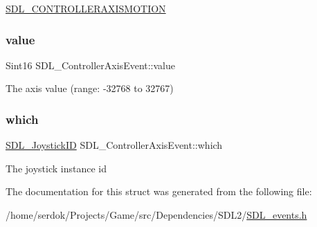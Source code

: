 \hyperlink{SDL__events_8h_a3b589e89be6b35c02e0dd34a55f3fccaaca6330126f4126f6a45454fa046c25f3}{S\+D\+L\+\_\+\+C\+O\+N\+T\+R\+O\+L\+L\+E\+R\+A\+X\+I\+S\+M\+O\+T\+I\+ON} \mbox{\label{structSDL__ControllerAxisEvent_a1ed7f14255ed01b982d40a38791d475a}} 
\subsubsection{\texorpdfstring{value}{value}}
{\footnotesize\ttfamily Sint16 S\+D\+L\+\_\+\+Controller\+Axis\+Event\+::value}

The axis value (range\+: -\/32768 to 32767) \mbox{\label{structSDL__ControllerAxisEvent_a07087f68ea9d64b50047d65312ee7b94}} 
\subsubsection{\texorpdfstring{which}{which}}
{\footnotesize\ttfamily \hyperlink{SDL__joystick_8h_a3c3d32500cb08f76ee8077983912c0bd}{S\+D\+L\+\_\+\+Joystick\+ID} S\+D\+L\+\_\+\+Controller\+Axis\+Event\+::which}

The joystick instance id 

The documentation for this struct was generated from the following file\+:\begin{DoxyCompactItemize}
\item 
/home/serdok/\+Projects/\+Game/src/\+Dependencies/\+S\+D\+L2/\hyperlink{SDL__events_8h}{S\+D\+L\+\_\+events.\+h}\end{DoxyCompactItemize}
